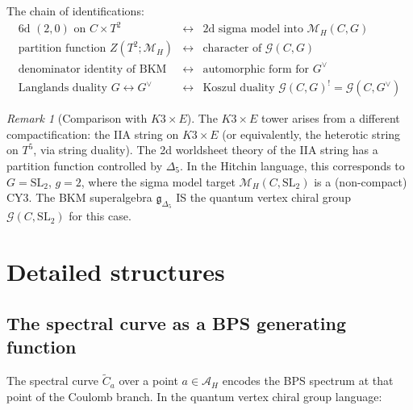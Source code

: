 \documentclass[11pt]{article}
\theoremstyle{definition}
\theoremstyle{remark}
\newtheorem{remark}[theorem]{Remark}
\newcommand{\frakg}{\mathfrak{g}}
\newcommand{\cA}{\mathcal{A}}
\newcommand{\cM}{\mathcal{M}}
\begin{document}
The chain of identifications:
\[
 \begin{array}{rcl}
 \text{6d $(2,0)$ on $C \times T^2$} & \longleftrightarrow & \text{2d sigma model into } \cM_H(C, G) \\[4pt]
 \text{partition function } Z(T^2; \cM_H) & \longleftrightarrow & \text{character of } \mathcal{G}(C, G) \\[4pt]
 \text{denominator identity of BKM} & \longleftrightarrow & \text{automorphic form for } G^\vee \\[4pt]
 \text{Langlands duality } G \leftrightarrow G^\vee & \longleftrightarrow & \text{Koszul duality } \mathcal{G}(C,G)^! = \mathcal{G}(C, G^\vee)
 \end{array}
\]

\begin{remark}[Comparison with $K3 \times E$]
\label{rem:6d-k3e}
The $K3 \times E$ tower arises from a different compactification: the IIA string on $K3 \times E$ (or equivalently, the heterotic string on $T^5$, via string duality). The 2d worldsheet theory of the IIA string has a partition function controlled by $\Delta_5$. In the Hitchin language, this corresponds to $G = \mathrm{SL}_2$, $g = 2$, where the sigma model target $\cM_H(C, \mathrm{SL}_2)$ is a (non-compact) CY3. The BKM superalgebra $\frakg_{\Delta_5}$ IS the quantum vertex chiral group $\mathcal{G}(C, \mathrm{SL}_2)$ for this case.
\end{remark}


\section{Detailed structures}
\label{sec:detailed-structures}

\subsection{The spectral curve as a BPS generating function}

The spectral curve $\widetilde{C}_a$ over a point $a \in \cA_H$ encodes the BPS spectrum at that point of the Coulomb branch. In the quantum vertex chiral group language:
\end{document}
